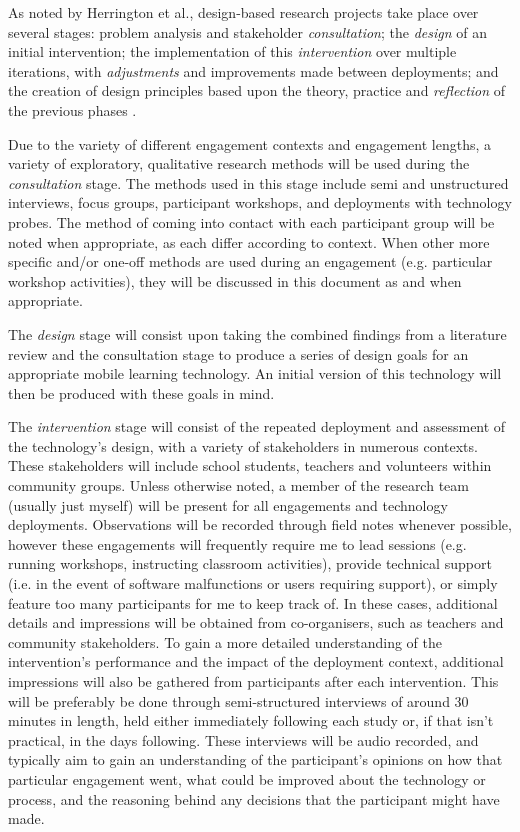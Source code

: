 As noted by Herrington et al., design-based research projects take place over several stages: problem analysis and stakeholder \textit{consultation}; the \textit{design} of an initial intervention; the implementation of this \textit{intervention} over multiple iterations, with \textit{adjustments} and improvements made between deployments; and the creation of design principles based upon the theory, practice and \textit{reflection} of the previous phases \citep{herrington2009}. 

Due to the variety of different engagement contexts and engagement lengths, a variety of exploratory, qualitative research methods will be used during the \textit{consultation} stage. The methods used in this stage include semi and unstructured interviews, focus groups, participant workshops, and deployments with technology probes. The method of coming into contact with each participant group will be noted when appropriate, as each differ according to context. When other more specific and/or one-off methods are used during an engagement (e.g. particular workshop activities), they will be discussed in this document as and when appropriate. 

The \textit{design} stage will consist upon taking the combined findings from a literature review and the consultation stage to produce a series of design goals for an appropriate mobile learning technology. An initial version of this technology will then be produced with these goals in mind. 

The \textit{intervention} stage will consist of the repeated deployment and assessment of the technology's design, with a variety of stakeholders in numerous contexts. These stakeholders will include school students, teachers and volunteers within community groups. Unless otherwise noted, a member of the research team (usually just myself) will be present for all engagements and technology deployments. Observations will be recorded through field notes whenever possible, however these engagements will frequently require me to lead sessions (e.g. running workshops, instructing classroom activities), provide technical support (i.e. in the event of software malfunctions or users requiring support), or simply feature too many participants for me to keep track of. In these cases, additional details and impressions will be obtained from co-organisers, such as teachers and community stakeholders. To gain a more detailed understanding of the intervention's performance and the impact of the deployment context, additional impressions will also be gathered from participants after each intervention. This will be preferably be done through semi-structured interviews of around 30 minutes in length, held either immediately following each study or, if that isn't practical, in the days following. These interviews will be audio recorded, and typically aim to gain an understanding of the participant's opinions on how that particular engagement went, what could be improved about the technology or process, and the reasoning behind any decisions that the participant might have made.

